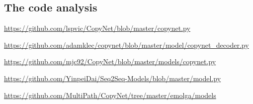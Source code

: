 \documentclass[UTF8]{ctexart}
\begin{document}
  
    \subsection{The code analysis}



    \url{https://github.com/lspvic/CopyNet/blob/master/copynet.py}
   
    \url{https://github.com/adamklec/copynet/blob/master/model/copynet_decoder.py}   
    
    \url{https://github.com/mjc92/CopyNet/blob/master/models/copynet.py}

    \url{https://github.com/YinpeiDai/Seq2Seq-Models/blob/master/model.py}

    \url{https://github.com/MultiPath/CopyNet/tree/master/emolga/models}




    
\end{document}
